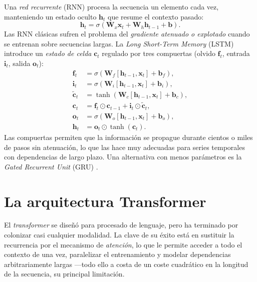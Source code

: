 Una \emph{red recurrente} (RNN) procesa la secuencia un elemento cada vez, manteniendo un estado oculto $\bm{h}_t$ que resume el contexto pasado:
\begin{equation}
\bm{h}_t = \sigma\!\left( \bm{W}_x \bm{x}_t + \bm{W}_h \bm{h}_{t-1} + \bm{b} \right).
\label{eq:rnn}
\end{equation}
Las RNN clásicas sufren el problema del \emph{gradiente atenuado o explotado} \cite{bengio1994gradient} cuando se entrenan sobre secuencias largas. La \emph{Long Short-Term Memory} (LSTM) \cite{hochreiter1997lstm} introduce un \emph{estado de celda} $\bm{c}_t$ regulado por tres compuertas (olvido $\bm{f}_t$, entrada $\bm{i}_t$, salida $\bm{o}_t$):
\begin{equation}
\begin{aligned}
\bm{f}_t &= \sigma\!\left( \bm{W}_f [\bm{h}_{t-1}, \bm{x}_t] + \bm{b}_f \right), \\
\bm{i}_t &= \sigma\!\left( \bm{W}_i [\bm{h}_{t-1}, \bm{x}_t] + \bm{b}_i \right), \\
\tilde{\bm{c}}_t &= \tanh\!\left( \bm{W}_c [\bm{h}_{t-1}, \bm{x}_t] + \bm{b}_c \right), \\
\bm{c}_t &= \bm{f}_t \odot \bm{c}_{t-1} + \bm{i}_t \odot \tilde{\bm{c}}_t, \\
\bm{o}_t &= \sigma\!\left( \bm{W}_o [\bm{h}_{t-1}, \bm{x}_t] + \bm{b}_o \right), \\
\bm{h}_t &= \bm{o}_t \odot \tanh(\bm{c}_t).
\end{aligned}
\label{eq:lstm}
\end{equation}
Las compuertas permiten que la información se propague durante cientos o miles de pasos sin atenuación, lo que las hace muy adecuadas para series temporales con dependencias de largo plazo. Una alternativa con menos parámetros es la \emph{Gated Recurrent Unit} (GRU) \cite{cho2014gru}.

\section{La arquitectura Transformer}
\label{sec:teo-transformer}

El \textit{transformer} \cite{vaswani2017attention} se diseñó para procesado de lenguaje, pero ha terminado por colonizar casi cualquier modalidad. La clave de su éxito está en sustituir la recurrencia por el mecanismo de \emph{atención}, lo que le permite acceder a todo el contexto de una vez, paralelizar el entrenamiento y modelar dependencias arbitrariamente largas ---todo ello a costa de un coste cuadrático en la longitud de la secuencia, su principal limitación.

